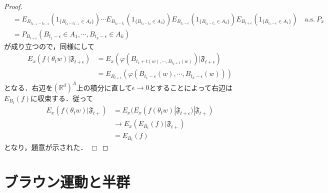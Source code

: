 \documentclass[dvipdfmx]{jsarticle}
\newtheorem{proof}{証明}
\def\qed{\hfill $\Box$}
\begin{document}
\begin{proof}
\begin{align*}
&=E_{B_{t_{k-1}-t_{k-2}}}(1_{\{B_{t_k-t_{k-1}}\in A_k\}})\cdots E_{B_{t_{2}-t_{1}}}(1_{\{B_{t_3-t_{2}}\in A_3\}})E_{B_{t_{1}-\epsilon}}(1_{\{B_{t_2-t_{1}}\in A_2\}})E_{B_{t+\epsilon}}(1_{\{B_{t_1-\epsilon}\in A_1\}}) \quad \mathrm{a.s.}{\ }P_x \\
&=P_{B_{t+\epsilon}}(B_{t_1-\epsilon}\in A_1,\cdots,B_{t_k-\epsilon}\in A_k)
\end{align*}
が成り立つので，同様にして
\begin{align*}
E_x(f(\theta_t w)|\mathfrak{F}_{t+\epsilon})
&=E_x(\varphi(B_{t_1+t(w),\cdots,B_{t_k+t}(w)})|\mathfrak{F}_{t+\epsilon}) \\
&=E_{B_{t+\epsilon}}(\varphi(B_{t_1-\epsilon}(w),\cdots,B_{t_k-\epsilon}(w)))
\end{align*}
となる．右辺を$(\mathbb{R}^d)^\Lambda$上の積分に直して$\epsilon\to 0$とすることによって右辺は$E_{B_t}(f)$に収束する．従って
\begin{align*}
E_x(f(\theta_t w)|\mathfrak{F}_{t+})
&=E_x(E_x(f(\theta_t w)|\mathfrak{F}_{t+\epsilon})|\mathfrak{F}_{t+}) \\
&\to E_x(E_{B_t}(f)|\mathfrak{F}_{t+}) \\
&=E_{B_t}(f)
\end{align*}
となり，題意が示された．
\qed
\end{proof}
%
%
%
%
\newpage
\section{ブラウン運動と半群}
\end{document}
